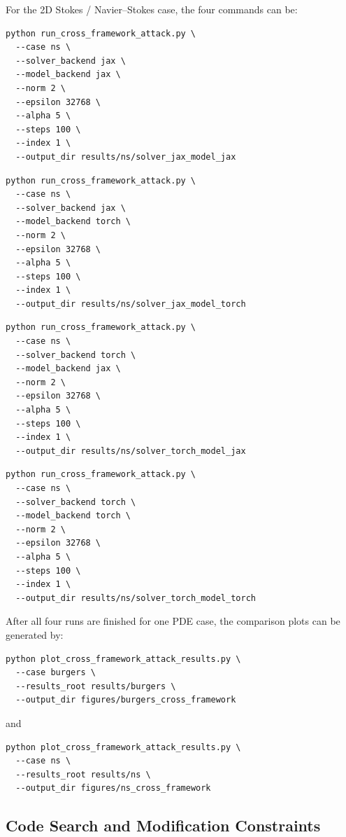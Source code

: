 \documentclass{article}
\begin{document}
For the 2D Stokes / Navier--Stokes case, the four commands can be:

\begin{verbatim}
python run_cross_framework_attack.py \
  --case ns \
  --solver_backend jax \
  --model_backend jax \
  --norm 2 \
  --epsilon 32768 \
  --alpha 5 \
  --steps 100 \
  --index 1 \
  --output_dir results/ns/solver_jax_model_jax
\end{verbatim}

\begin{verbatim}
python run_cross_framework_attack.py \
  --case ns \
  --solver_backend jax \
  --model_backend torch \
  --norm 2 \
  --epsilon 32768 \
  --alpha 5 \
  --steps 100 \
  --index 1 \
  --output_dir results/ns/solver_jax_model_torch
\end{verbatim}

\begin{verbatim}
python run_cross_framework_attack.py \
  --case ns \
  --solver_backend torch \
  --model_backend jax \
  --norm 2 \
  --epsilon 32768 \
  --alpha 5 \
  --steps 100 \
  --index 1 \
  --output_dir results/ns/solver_torch_model_jax
\end{verbatim}

\begin{verbatim}
python run_cross_framework_attack.py \
  --case ns \
  --solver_backend torch \
  --model_backend torch \
  --norm 2 \
  --epsilon 32768 \
  --alpha 5 \
  --steps 100 \
  --index 1 \
  --output_dir results/ns/solver_torch_model_torch
\end{verbatim}

After all four runs are finished for one PDE case, the comparison plots can be generated by:

\begin{verbatim}
python plot_cross_framework_attack_results.py \
  --case burgers \
  --results_root results/burgers \
  --output_dir figures/burgers_cross_framework
\end{verbatim}

and

\begin{verbatim}
python plot_cross_framework_attack_results.py \
  --case ns \
  --results_root results/ns \
  --output_dir figures/ns_cross_framework
\end{verbatim}

\subsection{Code Search and Modification Constraints}
\end{document}
